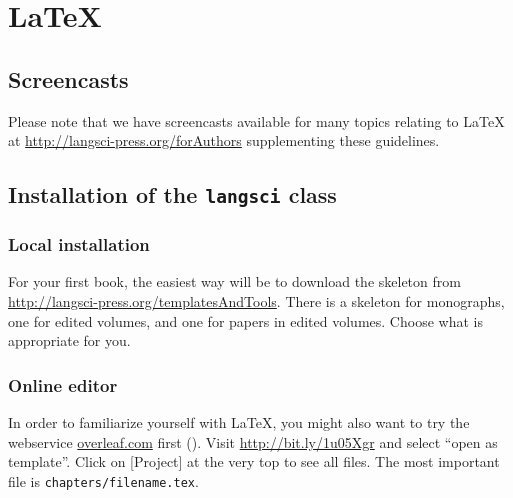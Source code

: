 \chapter{\LaTeX\xspace}

\section{Screencasts}
Please note that we have screencasts available for many topics relating to {\LaTeX\xspace} at \url{http://langsci-press.org/forAuthors} supplementing these guidelines.

\section{Installation of the \texttt{langsci} class}
\subsection{Local installation}
For your first book, the easiest way will be to download the skeleton from \url{http://langsci-press.org/templatesAndTools}.
There is a skeleton for monographs, one for edited volumes, and one for papers in edited volumes. Choose what is appropriate for you.
 


\subsection{Online editor}
In order to familiarize yourself with \LaTeX\xspace, you might also want to try the webservice \url{overleaf.com} first (). Visit \url{http://bit.ly/1u05Xgr} and select ``open as template''. Click on [Project] at the very top to see all files. The most important file is \verb+chapters/filename.tex+.

